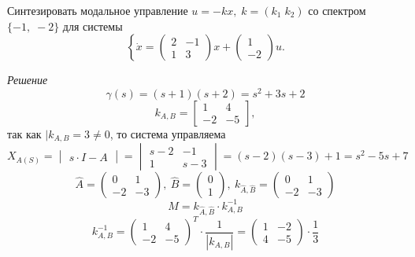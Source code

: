 \documentclass[../../TAU.tex]{subfiles}
\begin{document}
    \examp Синтезировать модальное управление $u = - k x, \; k = (k_1\; k_2)$ со спектром $\{-1,\; -2\}$ для системы
    $$
        \left\{
        \dot x =
        \begin{pmatrix}
            2 & -1\\
            1 & 3
        \end{pmatrix}
         x + \begin{pmatrix}1\\ -2\end{pmatrix}u\right..
    $$

    {\it Решение}
    $$
        \gamma(s)=(s+1)(s+2)=s^2+3s+2
    $$
    $$
        k_{A,B} = 
        \begin{bmatrix}
            1 & 4\\
            -2 & -5
        \end{bmatrix}
        ,
    $$
    так как $|k_{A,B}=3\neq0$, то система управляема
    $$
        X_{A(S)}=
        \begin{vmatrix}
            s\cdot I - A
        \end{vmatrix}
        =
        \begin{vmatrix}
            s-2 & -1\\
            1 & s-3
        \end{vmatrix}
        =(s-2)(s-3)+1 = s^2-5s+7
    $$
    $$
        \widehat A =
        \begin{pmatrix}
            0 & 1\\
            -2 & -3
        \end{pmatrix},\ 
        \widehat B=
        \begin{pmatrix}
            0 \\ 1
        \end{pmatrix},\ 
        k_{\widehat A,\widehat B} = 
        \begin{pmatrix}
            0 & 1\\
            -2 & -3
        \end{pmatrix}
    $$
    $$
        M = k_{\widehat A, \widehat B}\cdot k^{-1}_{A,B}
    $$
    $$
        k^{-1}_{A,B}=
        \begin{pmatrix}
            1 & 4\\
            -2 & -5
        \end{pmatrix}^{T}\cdot
        \frac{1}{|k_{A, B}|}
        =
        \begin{pmatrix}
            1 & -2\\
            4 & -5
        \end{pmatrix}\cdot
        \frac{1}{3}        
    $$
\end{document}
